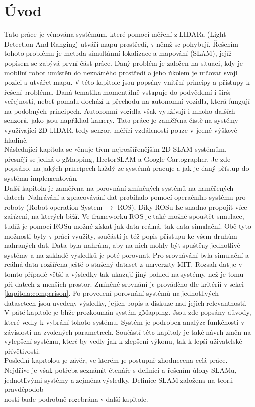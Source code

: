\documentclass[12pt]{report}
\begin{document}
\newpage	
	
\tableofcontents
\newpage

\chapter{Úvod}
Tato práce je věnována systémům, které pomocí měření z LIDARu (Light Detection And Ranging) utváří mapu prostředí, v němž se pohybují. Řešením tohoto problému je metoda simultánní lokalizace a mapování (SLAM), jejíž popisem se zabývá první část práce. Daný problém je založen na situaci, kdy je mobilní robot umístěn do neznámého prostředí a jeho úkolem je určovat svoji pozici a utvářet mapu. V této kapitole jsou popsány vnitřní principy a přístupy k řešení problému. Daná tematika momentálně vstupuje do podvědomí i širší veřejnosti, neboť pomalu dochází k přechodu na autonomní vozidla, která fungují na podobných principech. Autonomní vozidla však využívají i mnoho dalších senzorů, jako jsou například kamery. Tato práce je zaměřena čistě na systémy využívající 2D LIDAR, tedy senzor, měřící vzdálenosti pouze v jedné výškové hladině.\\
\indent Následující kapitola se věnuje třem nejrozšířenějším 2D SLAM systémům, přesněji se jedná o gMapping, HectorSLAM a Google Cartographer. Je zde popsáno, na jakých principech každý ze systémů pracuje a jak je daný přístup do systému implementován. \\
\indent Další kapitola je zaměřena na porovnání zmíněných systémů na naměřených datech. Nahrávání a zpracovávání dat probíhalo pomocí operačního systému pro roboty (Robot operation System $\rightarrow$ ROS). Díky ROSu lze snadno propojit více zařízení, na kterých běží. Ve frameworku ROS je také možné spouštět simulace, tudíž je pomocí ROSu možné získat jak data reálná, tak data simulační. Obě tyto možnosti byly v práci využity, součástí je též popis přístupu ke všem druhům nahraných dat. Data byla nahrána, aby na nich mohly být spuštěny jednotlivé systémy a na základě výsledků je poté porovnat. Pro srovnávání byla simulační a reálná data rozšířena ještě o stažený dataset z univerzity MIT. Rozsah dat je v tomto případě větší a výsledky tak ukazují jiný pohled na systémy, než je tomu při datech z menších prostor. Zmíněné srovnání je prováděno dle kritérií v sekci \ref{kapitola:comparison}. Po provedení porovnání systémů na jednotlivých datasetech jsou uvedeny výsledky, jejich popis a diskuze nad jejich relevantností. \\
\indent V páté kapitole je blíže prozkoumán systém gMapping. Jsou zde popsány důvody, které vedly k vybrání tohoto systému. Systém je podroben analýze funkčnosti v závislosti na zvolených parametrech. Součástí této kapitoly je také návrh změn na vylepšení systému, které by vedly jak k zlepšení výkonu, tak k lepší uživatelské přívětivosti. \\
\indent Poslední kapitolou je závěr, ve kterém je postupně zhodnocena celá práce. Nejdříve je však potřeba seznámit čtenáře s definicí a řešením úlohy SLAMu, jednotlivými systémy a zejména výsledky. Definice SLAM založená na teorii pravděpodob-\\nosti bude podrobně rozebrána v další kapitole.
\newpage
\end{document}
